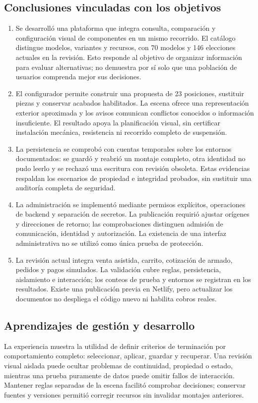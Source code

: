 \documentclass[12pt,letterpaper]{article}
\begin{document}
\subsection{Conclusiones vinculadas con los objetivos}
\begin{enumerate}
\item Se desarrolló una plataforma que integra consulta, comparación y configuración visual de componentes en un mismo recorrido. El catálogo distingue modelos, variantes y recursos, con 70 modelos y 146 elecciones actuales en la revisión. Esto responde al objetivo de organizar información para evaluar alternativas; no demuestra por sí solo que una población de usuarios comprenda mejor sus decisiones.
\item El configurador permite construir una propuesta de 23 posiciones, sustituir piezas y conservar acabados habilitados. La escena ofrece una representación exterior aproximada y los avisos comunican conflictos conocidos o información insuficiente. El resultado apoya la planificación visual, sin certificar instalación mecánica, resistencia ni recorrido completo de suspensión.
\item La persistencia se comprobó con cuentas temporales sobre los entornos documentados: se guardó y reabrió un montaje completo, otra identidad no pudo leerlo y se rechazó una escritura con revisión obsoleta. Estas evidencias respaldan los escenarios de propiedad e integridad probados, sin sustituir una auditoría completa de seguridad.
\item La administración se implementó mediante permisos explícitos, operaciones de backend y separación de secretos. La publicación requirió ajustar orígenes y direcciones de retorno; las comprobaciones distinguen admisión de comunicación, identidad y autorización. La existencia de una interfaz administrativa no se utilizó como única prueba de protección.
\item La revisión actual integra venta asistida, carrito, cotización de armado, pedidos y pagos simulados. La validación cubre reglas, persistencia, aislamiento e interacción; los conteos de prueba y entornos se registran en los resultados. Existe una publicación previa en Netlify, pero actualizar los documentos no despliega el código nuevo ni habilita cobros reales.

\end{enumerate}

\subsection{Aprendizajes de gestión y desarrollo}
La experiencia muestra la utilidad de definir criterios de terminación por comportamiento completo: seleccionar, aplicar, guardar y recuperar. Una revisión visual aislada puede ocultar problemas de continuidad, propiedad o estado, mientras una prueba puramente de datos puede omitir fallos de interacción. Mantener reglas separadas de la escena facilitó comprobar decisiones; conservar fuentes y versiones permitió corregir recursos sin invalidar montajes anteriores.
\end{document}
